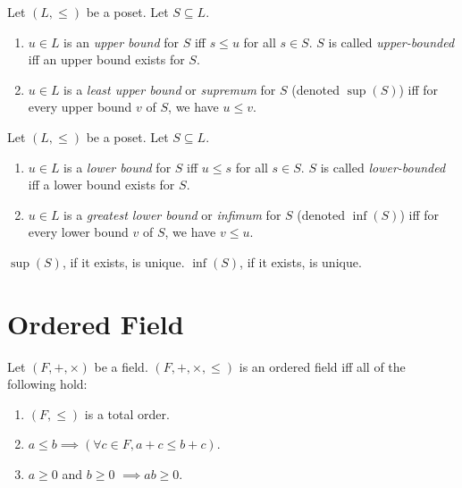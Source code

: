 \documentclass[a4paper, 12pt, fleqn]{article}
\begin{document}
\begin{definition}
Let $(L, \le)$ be a poset. Let $S \subseteq L$.
\begin{enumerate}
\item $u \in L$ is an \emph{upper bound} for $S$ iff $s \le u$ for all $s \in S$.
    $S$ is called \emph{upper-bounded} iff an upper bound exists for $S$.
\item $u \in L$ is a \emph{least upper bound} or \emph{supremum} for $S$ (denoted $\sup(S)$)
    iff for every upper bound $v$ of $S$, we have $u \le v$.
\end{enumerate}
\end{definition}

\begin{definition}
Let $(L, \le)$ be a poset. Let $S \subseteq L$.
\begin{enumerate}
\item $u \in L$ is a \emph{lower bound} for $S$ iff $u \le s$ for all $s \in S$.
    $S$ is called \emph{lower-bounded} iff a lower bound exists for $S$.
\item $u \in L$ is a \emph{greatest lower bound} or \emph{infimum} for $S$ (denoted $\inf(S)$) iff
    for every lower bound $v$ of $S$, we have $v \le u$.
\end{enumerate}
\end{definition}

\begin{lemma}
$\sup(S)$, if it exists, is unique.
$\inf(S)$, if it exists, is unique.
\end{lemma}

\section{Ordered Field}

\begin{definition}
\label{defn:ord-field}
Let $(F, +, \times)$ be a field.
$(F, +, \times, \le)$ is an ordered field iff all of the following hold:
\begin{enumerate}
\item $(F, \le)$ is a total order.
\item $a \le b \implies (\forall c \in F, a + c \le b + c)$.
\item $a \ge 0$ and $b \ge 0$ $\implies ab \ge 0$.
\end{enumerate}
\end{definition}
\end{document}
